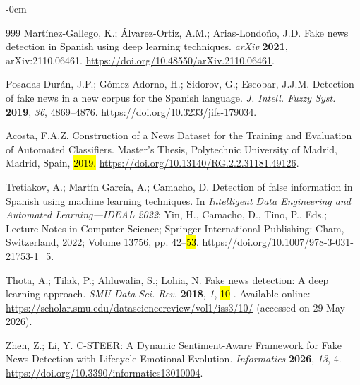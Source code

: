 \documentclass[informatics,article,accept,pdftex,moreauthors]{Definitions/mdpi}
\begin{document}
\begin{adjustwidth}{-\extralength}{0cm}
\begin{thebibliography}{999}
Martínez-Gallego, K.; Álvarez-Ortiz, A.M.; Arias-Londoño, J.D. Fake news detection in Spanish using deep learning techniques. \textit{arXiv} \textbf{2021}, arXiv:2110.06461. \href{https://doi.org/10.48550/arXiv.2110.06461}{https://doi.org/10.48550/arXiv.2110.06461}.
 
Posadas-Durán, J.P.; Gómez-Adorno, H.; Sidorov, G.; Escobar, J.J.M. Detection of fake news in a new corpus for the Spanish language. \textit{J. Intell. Fuzzy Syst.} \textbf{2019}, \textit{36}, 4869--4876. \href{https://doi.org/10.3233/jifs-179034}{https://doi.org/10.3233/jifs-179034}.
 
Acosta, F.A.Z. Construction of a News Dataset for the Training and Evaluation of Automated Classifiers. Master's Thesis, Polytechnic University of Madrid, Madrid, Spain, \hl{2019.} \href{https://doi.org/10.13140/RG.2.2.31181.49126}{https://doi.org/10.13140/RG.2.2.31181.49126}. %
 
Tretiakov, A.; Martín García, A.; Camacho, D. Detection of false information in Spanish using machine learning techniques. In \emph{Intelligent Data Engineering and Automated Learning---IDEAL 2022}; Yin, H., Camacho, D., Tino, P., Eds.; Lecture Notes in Computer Science; Springer International Publishing: Cham, Switzerland, 2022; Volume 13756, pp. 42--\hl{53}. %
 \href{https://doi.org/10.1007/978-3-031-21753-1_5}{https://doi.org/10.1007/978-3-031-21753-1\_5}.
 
Thota, A.; Tilak, P.; Ahluwalia, S.; Lohia, N. Fake news detection: A deep learning approach. \textit{SMU Data Sci. Rev.} \textbf{2018}, \textit{1}, \hl{10}%
. Available online: \href{https://scholar.smu.edu/datasciencereview/vol1/iss3/10/}{https://scholar.smu.edu/datasciencereview/vol1/iss3/10/} (accessed on 29 May 2026).
 
Zhen, Z.; Li, Y. C-STEER: A Dynamic Sentiment-Aware Framework for Fake News Detection with Lifecycle Emotional Evolution. \textit{Informatics} \textbf{2026}, \textit{13}, 4. \href{https://doi.org/10.3390/informatics13010004}{https://doi.org/10.3390/informatics13010004}.
 

\end{thebibliography}
\end{adjustwidth}
\end{document}
